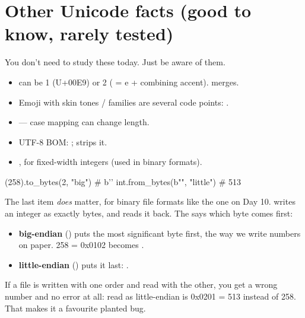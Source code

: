 \documentclass[10pt,a4paper]{article}
\begin{document}
\section{Other Unicode facts (good to know, rarely tested)}
You don’t need to study these today. Just be aware of them.
\begin{itemize}
\item {} can be 1 (U+00E9) or 2 ( = e + combining accent).  merges.
\item Emoji with skin tones / families are several code points: .
\item {} — case mapping can change length.
\item UTF-8 BOM: ;  strips it.
\item {},  for fixed-width integers (used in binary formats).
\end{itemize}
\begin{pycode}
  (258).to_bytes(2, "big")     # b''
  int.from_bytes(b"", "little")  # 513
\end{pycode}
The last item \emph{does} matter, for binary file formats like the one on Day 10.  writes an integer as exactly  bytes, and  reads it back. The  says which byte comes first:
\begin{itemize}
\item \textbf{big-endian} () puts the most significant byte first, the way we write numbers on paper. 258 = 0x0102 becomes .
\item \textbf{little-endian} () puts it last: .
\end{itemize}
If a file is written with one order and read with the other, you get a wrong number and no error at all:  read as little-endian is 0x0201 = 513 instead of 258. That makes it a favourite planted bug.
\setcounter{section}{5}
\end{document}
